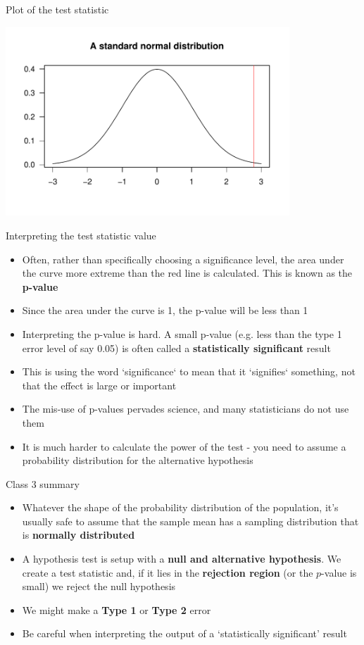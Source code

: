 \documentclass[12pt,xcolor=dvipsnames,handout,mathserif,aspectratio=169]{beamer}
\newcommand{\bbl}[1]{{\color{NavyBlue} \textbf{#1}}}
\newcommand{\bre}[1]{{\color{red} \textbf{#1}}}
\newcommand{\bgr}[1]{{\color{PineGreen} \textbf{#1}}}
\begin{document}
\begin{frame}{Plot of the test statistic}

\centering \includegraphics[width=0.8\textwidth]{zscore.pdf}

\end{frame}

\begin{frame}{Interpreting the test statistic value}

\begin{itemize}
\item Often, rather than specifically choosing a significance level, the area under the curve more extreme than the red line is calculated. This is known as the \bre{p-value}
\item Since the area under the curve is 1, the p-value will be less than 1
\item Interpreting the p-value is hard. A small p-value (e.g. less than the type 1 error level of say 0.05) is often called a \bbl{statistically significant} result
\item This is using the word `significance` to mean that it `signifies` something, not that the effect is large or important
\item The mis-use of p-values pervades science, and many statisticians do not use them
\item It is much harder to calculate the power of the test - you need to assume a probability distribution for the alternative hypothesis
\end{itemize}

\end{frame}

\begin{frame}{Class 3 summary}

\begin{itemize}
\item Whatever the shape of the probability distribution of the population, it's usually safe to assume that the sample mean has a sampling distribution that is \bgr{normally distributed}
\item A hypothesis test is setup with a \bgr{null and alternative hypothesis}. We create a test statistic and, if it lies in the \bre{rejection region}
 (or the $p$-value is small) we reject the null hypothesis
\item We might make a \bre{Type 1} or \bre{Type 2} error
\item Be careful when interpreting the output of a `statistically significant' result
\end{itemize}
\end{frame}
\end{document}
